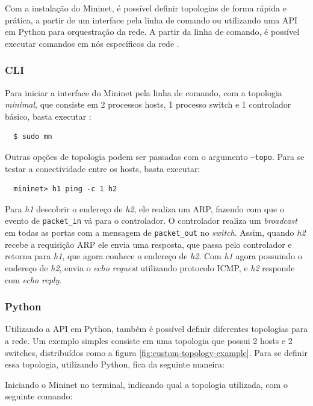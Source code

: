 \documentclass[
    12pt,
    openright, 
    oneside,
    a4paper,
    french,
    english,
    brazil
    ]{facom-ufu-abntex2}
\theoremstyle{definition}
\begin{document}
Com a instalação do Mininet, é possível definir topologias de forma rápida e prática, a partir
de um interface pela linha de comando ou utilizando uma API em Python para orquestração da rede.
A partir da linha de comando, é possível executar comandos em nós específicos da rede 
\cite{mininetDocs}. 

\subsubsection{CLI}
Para iniciar a interface do Mininet pela linha de comando, com a topologia
\emph{minimal}, que consiste em 2 processos hosts, 1 processo switch e 1 controlador
básico, basta executar \cite{mininetOrg}:

\begin{verbatim}
  $ sudo mn
\end{verbatim}

Outras opções de topologia podem ser passadas com o argumento \texttt{--topo}. Para se testar a
conectividade entre os hosts, basta executar:

\begin{verbatim}
  mininet> h1 ping -c 1 h2
\end{verbatim}

Para \emph{h1} descobrir o endereço de \emph{h2}, ele realiza um ARP, fazendo com que o evento de 
\texttt{packet\_in} vá para o controlador. O controlador realiza um \emph{broadcast} em todas as portas
com a mensagem de \texttt{packet\_out} no \emph{switch}. Assim, quando \emph{h2} recebe a requisição ARP ele
envia uma resposta, que passa pelo controlador e retorna para \emph{h1}, que agora conhece o endereço
de \emph{h2}. Com \emph{h1} agora possuindo o endereço de \emph{h2}, envia o \emph{echo request} utilizando
protocolo ICMP, e \emph{h2} responde com \emph{echo reply}.

\subsubsection{Python}
Utilizando a API em Python, também é possível definir diferentes topologias para a rede. Um
exemplo simples consiste em uma topologia que possui 2 hosts e 2 switches, distribuídos como
a figura \ref{fig:custom-topology-example}. Para se definir essa topologia, utilizando
Python, fica da seguinte maneira:



Iniciando o Mininet no terminal, indicando qual a topologia utilizada, com o seguinte comando:
\end{document}
